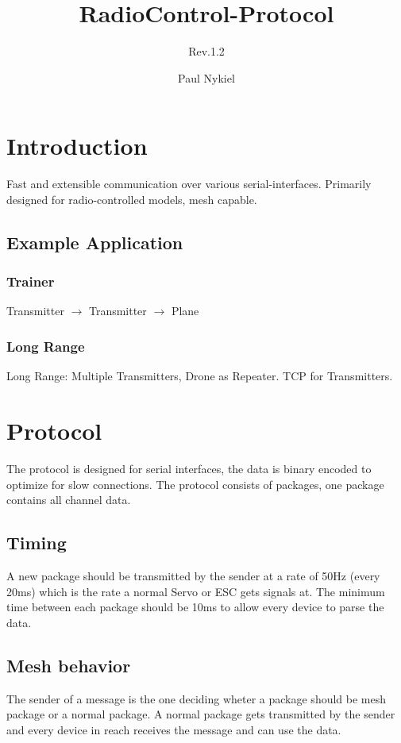 \documentclass{scrreprt}
\title{RadioControl-Protocol}
\subtitle{Rev.1.2}
\author{Paul Nykiel}
\begin{document}
\maketitle
\tableofcontents

\pagebreak

\chapter{Introduction}
  Fast and extensible communication over various serial-interfaces. Primarily
  designed for radio-controlled models, mesh capable.

\section{Example Application}
\subsection{Trainer}
Transmitter $\to$ Transmitter $\to$ Plane
\subsection{Long Range}
  Long Range: Multiple Transmitters, Drone as Repeater. TCP for Transmitters.

\chapter{Protocol}
The protocol is designed for serial interfaces, the data is binary encoded to
optimize for slow connections. The protocol consists of packages, one package
contains all channel data.

\section{Timing}
A new package should be transmitted by the sender at a rate of 50Hz (every
20ms) which is the rate a normal Servo or ESC gets signals at. The minimum
time between each package should be 10ms to allow every device to parse the
data.

\section{Mesh behavior}
The sender of a message is the one deciding wheter a package should be mesh
package or a normal package. A normal package gets transmitted by the sender
and every device in reach receives the message and can use the data.
\end{document}
